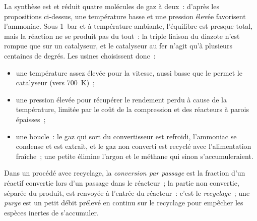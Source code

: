 La synthèse est  et réduit quatre molécules de gaz à deux~: d'après
les propositions ci-dessus, une température basse et une pression élevée favorisent l'ammoniac.
Sous \qty{1}{bar} et à température ambiante, l'équilibre est presque total, mais
la réaction ne se produit pas du tout~: la triple liaison du diazote n'est rompue que
sur un catalyseur, et le catalyseur au fer n'agit qu'à plusieurs centaines de
degrés. Les usines choisissent donc~:
\begin{itemize}
  \item une température assez élevée pour la vitesse, aussi basse que le permet le catalyseur
        (vers \qty{700}{K})~;
  \item une pression élevée pour récupérer le rendement perdu à cause de la température, limitée
        par le coût de la compression et des réacteurs à parois épaisses~;
  \item une boucle~: le gaz qui sort du convertisseur est refroidi, l'ammoniac se condense
        et est extrait, et le gaz non converti est recyclé avec l'alimentation fraîche~;
        une petite  élimine l'argon et le méthane qui sinon
        s'accumuleraient.
\end{itemize}

\begin{definition}\label{def:b2:equilibrium-shifts:single-pass}
Dans un procédé avec recyclage, la \emph{conversion par passage}
est la fraction d'un réactif convertie lors d'un passage dans
le réacteur~; la partie non convertie, séparée du produit, est renvoyée
à l'entrée du réacteur~: c'est le \emph{recyclage}~; une
\emph{purge} est un petit débit prélevé en continu sur le
recyclage pour empêcher les espèces inertes de s'accumuler.
\end{definition}

